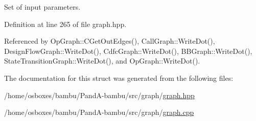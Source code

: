 Set of input parameters. 



Definition at line 265 of file graph.\+hpp.



Referenced by Op\+Graph\+::\+C\+Get\+Out\+Edges(), Call\+Graph\+::\+Write\+Dot(), Design\+Flow\+Graph\+::\+Write\+Dot(), Cdfc\+Graph\+::\+Write\+Dot(), B\+B\+Graph\+::\+Write\+Dot(), State\+Transition\+Graph\+::\+Write\+Dot(), and Op\+Graph\+::\+Write\+Dot().



The documentation for this struct was generated from the following files\+:\begin{DoxyCompactItemize}
\item 
/home/osboxes/bambu/\+Pand\+A-\/bambu/src/graph/\hyperlink{graph_8hpp}{graph.\+hpp}\item 
/home/osboxes/bambu/\+Pand\+A-\/bambu/src/graph/\hyperlink{graph_8cpp}{graph.\+cpp}\end{DoxyCompactItemize}
